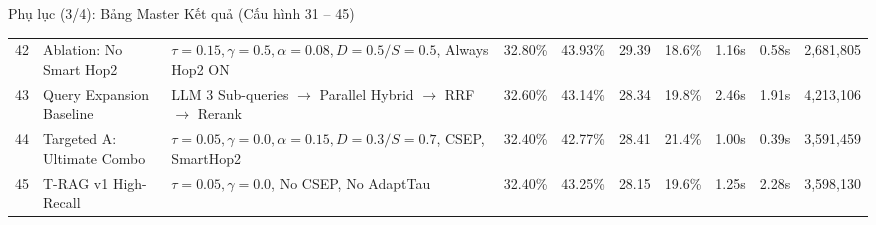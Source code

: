 \documentclass[aspectratio=169,10pt]{beamer}
\begin{document}
\begin{frame}{Phụ lục (3/4): Bảng Master Kết quả (Cấu hình 31 -- 45)}
{\begin{tabular}{c l l ccccccc}
42 & Ablation: No Smart Hop2 & $\tau=0.15, \gamma=0.5, \alpha=0.08, D=0.5/S=0.5$, Always Hop2 ON & 32.80\% & 43.93\% & 29.39 & 18.6\% & 1.16s & 0.58s & 2,681,805 \\
43 & Query Expansion Baseline & LLM 3 Sub-queries $\rightarrow$ Parallel Hybrid $\rightarrow$ RRF $\rightarrow$ Rerank & 32.60\% & 43.14\% & 28.34 & 19.8\% & 2.46s & 1.91s & 4,213,106 \\
44 & Targeted A: Ultimate Combo & $\tau=0.05, \gamma=0.0, \alpha=0.15, D=0.3/S=0.7$, CSEP, SmartHop2 & 32.40\% & 42.77\% & 28.41 & 21.4\% & 1.00s & 0.39s & 3,591,459 \\
45 & T-RAG v1 High-Recall & $\tau=0.05, \gamma=0.0$, No CSEP, No AdaptTau & 32.40\% & 43.25\% & 28.15 & 19.6\% & 1.25s & 2.28s & 3,598,130 \\
\bottomrule
\end{tabular}
}
\end{frame}
\end{document}
